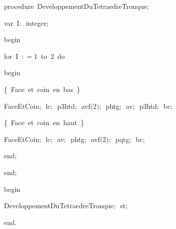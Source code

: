 {\pagebreak[3] 
\vspace{\neglskip}\mbox{\blc  \blk\idt  \mcl procedure\idt \ DeveloppementDuTetraedreTronque$;$}\par 
\pagebreak[3] 
\vspace{\neglskip}\mbox{\blc  \blk\blk\idt  \mcl var\idt \ I$:$\ integer$;$}\par 
\vspace{\neglskip}\mbox{\blc  \blk\idt  \mcl begin\idt }\par 
\pagebreak[3] 
\vspace{\neglskip}\mbox{\blc  \blk\blk\idt  \mcl for\idt \ I\ $:$$=$1\ \mcl to\idt \ 2\ \mcl do\idt }\par 
\vspace{\neglskip}\mbox{\blc  \blk\blk\blk\idt  \mcl begin\idt }\par 
\vspace{\neglskip}\mbox{\blc  \blk\blk\blk\blk\idt  \cmt  \{\ Face\ et\ coin\ en\ bas\ \}\idt }\par 
\vspace{\neglskip}\mbox{\blc  \blk\blk\blk\blk\idt  FaceEtCoin$;$\ lc$;$\ p3htd$;$\ avf$($2$)$$;$\ phtg$;$\ av$;$\ p3htd$;$\ bc$;$\ }\par 
\vspace{\neglskip}\mbox{\blc  \blk\blk\blk\blk\idt  \cmt  \{\ Face\ et\ coin\ en\ haut\ \}\idt }\par 
\vspace{\neglskip}\mbox{\blc  \blk\blk\blk\blk\idt  FaceEtCoin$;$\ lc$;$\ av$;$\ phtg$;$\ avf$($2$)$$;$\ pqtg$;$\ bc$;$\ }\par 
\vspace{\neglskip}\mbox{\blc  \blk\blk\blk\idt  \mcl end\idt $;$}\par 
\vspace{\neglskip}\mbox{\blc  \blk\idt  \mcl end\idt $;$\ }\par 
\medskip

\vspace{\neglskip}\mbox{\blc  \idt  \mcl begin\idt }\par 
\vspace{\neglskip}\mbox{\blc  \blk\idt  DeveloppementDuTetraedreTronque$;$\ st$;$}\par 
\vspace{\neglskip}\mbox{\blc  \idt  \mcl end\idt $.$}\par 

\medskip }

